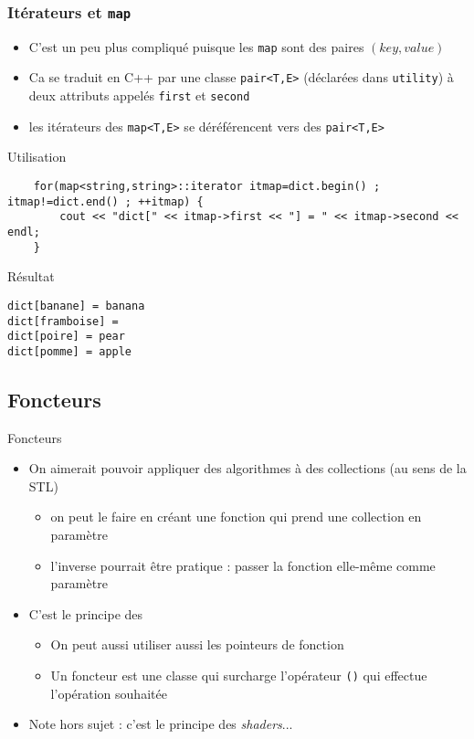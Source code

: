 \begin{frame}[fragile]\frametitle{Itérateurs et \texttt{map}}
\begin{itemize}
\item C'est un peu plus compliqué puisque les \verb|map| sont des paires $(key,value)$
\item Ca se traduit en C++ par une classe \verb|pair<T,E>| (déclarées dans \verb|utility|) à deux attributs appelés \verb|first| et \verb|second|
\item les itérateurs des \verb|map<T,E>| se déréférencent vers des \verb|pair<T,E>|
\end{itemize}
\begin{codeblock}{Utilisation}
\begin{lstlisting}
    for(map<string,string>::iterator itmap=dict.begin() ; itmap!=dict.end() ; ++itmap) {
        cout << "dict[" << itmap->first << "] = " << itmap->second << endl;
    }
\end{lstlisting}
\end{codeblock}
\begin{block}{Résultat}
{\tiny
\begin{verbatim}
dict[banane] = banana
dict[framboise] =
dict[poire] = pear
dict[pomme] = apple
\end{verbatim}
}
\end{block}
\end{frame}


\subsection{Foncteurs}

\begin{frame}{Foncteurs}

\begin{itemize}
\itemsep1pt\parskip0pt
\item
  On aimerait pouvoir appliquer des algorithmes à des collections (au
  sens de la STL)

  \begin{itemize}
  \itemsep1pt\parskip0pt
  \item
    on peut le faire en créant une fonction qui prend une collection en
    paramètre
  \item
    l'inverse pourrait être pratique : passer la fonction elle-même
    comme paramètre
  \end{itemize}
\item
  C'est le principe des 

  \begin{itemize}
  \itemsep1pt\parskip0pt
  \item
    On peut aussi utiliser aussi les pointeurs de fonction
  \item
    Un foncteur est une classe qui surcharge l'opérateur \texttt{()} qui effectue
    l'opération souhaitée
  \end{itemize}
  \item Note hors sujet : c'est le principe des \textit{shaders}...
\end{itemize}

\end{frame}

